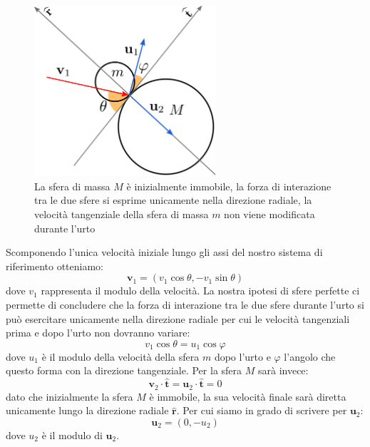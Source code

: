 \documentclass[a4paper,10pt,oneside]{article}
\begin{document}
\begin{figure}[h]
 \centering
 \includegraphics[width=0.6\textwidth]{./immagini/sfere_diverse.png}
 \caption{La  sfera di massa $M$ è inizialmente immobile, la forza di interazione tra le due sfere si esprime unicamente nella direzione radiale, la velocità tangenziale della sfera di massa $m$ non viene modificata durante l'urto}\label{fig:sfere diverse}
\end{figure}
Scomponendo l'unica velocità iniziale lungo gli assi del nostro sistema di riferimento otteniamo:
\begin{equation}\label{v_iniziale_bi}
 \mathbf{v}_1=(v_1\cos \theta,-v_1\sin\theta)
\end{equation}
dove $v_1$ rappresenta il modulo della velocità. La nostra ipotesi di sfere perfette ci permette di concludere che la forza di interazione tra le due sfere durante l'urto si può esercitare unicamente nella direzione radiale per cui le velocità tangenziali prima e dopo l'urto non dovranno variare:
\begin{equation}
 v_1\cos\theta=u_1\cos\varphi
\end{equation}
dove $u_1$ è il modulo della velocità della sfera $m$ dopo l'urto e $\varphi$ l'angolo che questo forma con la direzione tangenziale.
Per la sfera $M$ sarà invece:
\begin{equation}
 \mathbf{v}_2\cdot\hat{\mathbf{t}}=\mathbf{u}_2\cdot\hat{\mathbf{t}}=0
\end{equation}
dato che inizialmente la sfera $M$ è immobile, la sua velocità finale sarà diretta unicamente lungo la direzione radiale $\hat{\mathbf{r}}$. Per cui siamo in grado di scrivere per $\mathbf{u}_2$:
\begin{equation}
 \mathbf{u}_2=(0,-u_2)
\end{equation}
dove $u_2$ è il modulo di $\mathbf{u}_2$.
\end{document}
